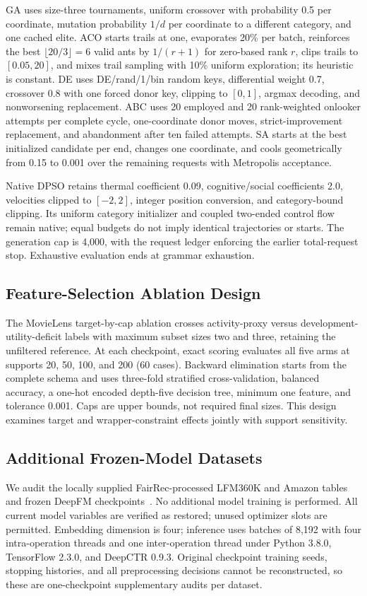 \documentclass[sigconf,nonacm]{acmart}
\begin{document}
GA uses size-three tournaments, uniform crossover with probability 0.5 per coordinate, mutation probability $1/d$ per coordinate to a different category, and one cached elite. ACO starts trails at one, evaporates 20\% per batch, reinforces the best $\lfloor20/3\rfloor=6$ valid ants by $1/(r+1)$ for zero-based rank $r$, clips trails to $[0.05,20]$, and mixes trail sampling with 10\% uniform exploration; its heuristic is constant. DE uses DE/rand/1/bin random keys, differential weight 0.7, crossover 0.8 with one forced donor key, clipping to $[0,1]$, argmax decoding, and nonworsening replacement. ABC uses 20 employed and 20 rank-weighted onlooker attempts per complete cycle, one-coordinate donor moves, strict-improvement replacement, and abandonment after ten failed attempts. SA starts at the best initialized candidate per end, changes one coordinate, and cools geometrically from 0.15 to 0.001 over the remaining requests with Metropolis acceptance.

Native DPSO retains thermal coefficient 0.09, cognitive/social coefficients 2.0, velocities clipped to $[-2,2]$, integer position conversion, and category-bound clipping. Its uniform category initializer and coupled two-ended control flow remain native; equal budgets do not imply identical trajectories or starts. The generation cap is 4,000, with the request ledger enforcing the earlier total-request stop. Exhaustive evaluation ends at grammar exhaustion.

\subsection{Feature-Selection Ablation Design}
The MovieLens target-by-cap ablation crosses activity-proxy versus development-utility-deficit labels with maximum subset sizes two and three, retaining the unfiltered reference. At each checkpoint, exact scoring evaluates all five arms at supports 20, 50, 100, and 200 (60 cases). Backward elimination starts from the complete schema and uses three-fold stratified cross-validation, balanced accuracy, a one-hot encoded depth-five decision tree, minimum one feature, and tolerance 0.001. Caps are upper bounds, not required final sizes. This design examines target and wrapper-constraint effects jointly with support sensitivity.

\subsection{Additional Frozen-Model Datasets}
We audit the locally supplied FairRec-processed LFM360K and Amazon tables and frozen DeepFM checkpoints~\cite{guo2023fairrec,guo2017deepfm}. No additional model training is performed. All current model variables are verified as restored; unused optimizer slots are permitted. Embedding dimension is four; inference uses batches of 8,192 with four intra-operation threads and one inter-operation thread under Python 3.8.0, TensorFlow 2.3.0, and DeepCTR 0.9.3. Original checkpoint training seeds, stopping histories, and all preprocessing decisions cannot be reconstructed, so these are one-checkpoint supplementary audits per dataset.
\end{document}
